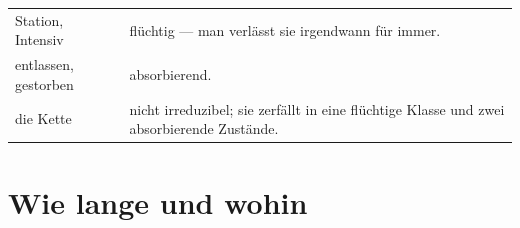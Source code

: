 \begin{merksatz}
\begin{center}
{\small
\renewcommand{\arraystretch}{1.5}
\begin{tabular}{@{}P{2.6cm}P{5.8cm}@{}}
\toprule
Station, Intensiv & flüchtig --- man verlässt sie irgendwann für immer.\\
entlassen, gestorben & absorbierend.\\
die Kette & nicht irreduzibel; sie zerfällt in eine flüchtige Klasse und zwei absorbierende Zustände.\\
\bottomrule
\end{tabular}}
\end{center}

\begin{center}
\begin{minipage}{0.88\textwidth}
\end{minipage}
\end{center}
\end{merksatz}

\section{Wie lange und wohin}

